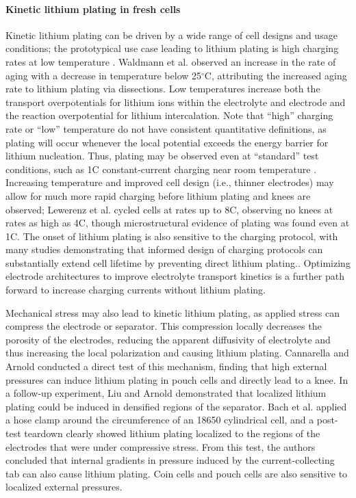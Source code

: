 \documentclass[journal=jpclcd,manuscript=article]{achemso}
\begin{document}
\paragraph{Kinetic lithium plating in fresh cells}
Kinetic lithium plating can be driven by a wide range of cell designs and usage conditions; the prototypical use case leading to lithium plating is high charging rates at low temperature \cite{waldmann_temperature_2014, petzl_lithium_2015}. Waldmann et al.\cite{waldmann_temperature_2014} observed an increase in the rate of aging with a decrease in temperature below 25$^{\circ}$C, attributing the increased aging rate to lithium plating via dissections. Low temperatures increase both the transport overpotentials for lithium ions within the electrolyte and electrode and the reaction overpotential for lithium intercalation. Note that ``high'' charging rate or ``low'' temperature do not have consistent quantitative definitions, as plating will occur whenever the local potential exceeds the energy barrier for lithium nucleation. Thus, plating may be observed even at ``standard'' test conditions, such as 1C constant-current charging near room temperature \cite{waldmann_optimization_2015,burns_-situ_2015}. Increasing temperature and improved cell design (i.e., thinner electrodes) may allow for much more rapid charging before lithium plating and knees are observed; Lewerenz et al.\cite{lewerenz_systematic_2017} cycled cells at rates up to 8C, observing no knees at rates as high as 4C, though microstructural evidence of plating was found even at 1C. The onset of lithium plating is also sensitive to the charging protocol, with many studies demonstrating that informed design of charging protocols can substantially extend cell lifetime by preventing direct lithium plating.\cite{waldmann_optimization_2015,schindler_fast_2018}. Optimizing electrode architectures to improve electrolyte transport kinetics is a further path forward to increase charging currents without lithium plating.\cite{nemani_design_2015, usseglio-viretta_enabling_2020}

Mechanical stress may also lead to kinetic lithium plating, as applied stress can compress the electrode or separator. This compression locally decreases the porosity of the electrodes, reducing the apparent diffusivity of electrolyte and thus increasing the local polarization and causing lithium plating. Cannarella and Arnold\cite{cannarella_stress_2014} conducted a direct test of this mechanism, finding that high external pressures can induce lithium plating in pouch cells and directly lead to a knee. In a follow-up experiment, Liu and Arnold\cite{liu_effects_2020} demonstrated that localized lithium plating could be induced in densified regions of the separator. Bach et al.\cite{bach_nonlinear_2016} applied a hose clamp around the circumference of an 18650 cylindrical cell, and a post-test teardown clearly showed lithium plating localized to the regions of the electrodes that were under compressive stress. From this test, the authors concluded that internal gradients in pressure induced by the current-collecting tab can also cause lithium plating. Coin cells and pouch cells are also sensitive to localized external pressures.\cite{liu_size_2018, fuchs_post-mortem_2019, okasinski_situ_2020}
\end{document}
